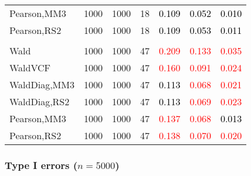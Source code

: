 \documentclass[
]{article}
\begin{document}
\begin{table}[H]
{\begin{tabular}[t]{lrrrrrr}
\hspace{1em}Pearson,MM3 & 1000 & 1000 & 18 & \textcolor{black}{0.109} & \textcolor{black}{0.052} & \textcolor{black}{0.010}\\
\hspace{1em}Pearson,RS2 & 1000 & 1000 & 18 & \textcolor{black}{0.109} & \textcolor{black}{0.053} & \textcolor{black}{0.011}\\
\addlinespace[0.3em]
\multicolumn{7}{l}{\textbf{3F 15V}}\\
\hspace{1em}Wald & 1000 & 1000 & 47 & \textcolor{red}{0.209} & \textcolor{red}{0.133} & \textcolor{red}{0.035}\\
\hspace{1em}WaldVCF & 1000 & 1000 & 47 & \textcolor{red}{0.160} & \textcolor{red}{0.091} & \textcolor{red}{0.024}\\
\hspace{1em}WaldDiag,MM3 & 1000 & 1000 & 47 & \textcolor{black}{0.113} & \textcolor{red}{0.068} & \textcolor{red}{0.021}\\
\hspace{1em}WaldDiag,RS2 & 1000 & 1000 & 47 & \textcolor{black}{0.113} & \textcolor{red}{0.069} & \textcolor{red}{0.023}\\
\hspace{1em}Pearson,MM3 & 1000 & 1000 & 47 & \textcolor{red}{0.137} & \textcolor{red}{0.068} & \textcolor{black}{0.013}\\
\hspace{1em}Pearson,RS2 & 1000 & 1000 & 47 & \textcolor{red}{0.138} & \textcolor{red}{0.070} & \textcolor{red}{0.020}\\
\bottomrule
\end{tabular}}
\endgroup{}
\end{table}

\hypertarget{type-i-errors-n5000-2}{%
\subsubsection{\texorpdfstring{Type I errors
(\(n=5000\))}{Type I errors (n=5000)}}\label{type-i-errors-n5000-2}}
\end{document}

